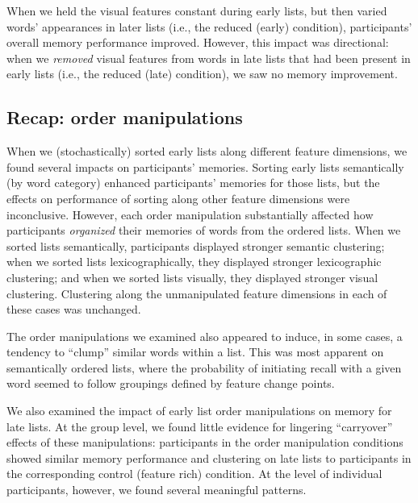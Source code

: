 \documentclass[11pt]{article}
\begin{document}
When we held the visual features constant during early lists, but then varied
words' appearances in later lists (i.e., the reduced (early) condition),
participants' overall memory performance improved. However, this impact was
directional: when we \textit{removed} visual features from words in late lists
that had been present in early lists (i.e., the reduced (late) condition), we
saw no memory improvement.

\subsection*{Recap: order manipulations}

When we (stochastically) sorted early lists along different feature dimensions,
we found several impacts on participants' memories. Sorting early lists
semantically (by word category) enhanced participants' memories for those
lists, but the effects on performance of sorting along other feature dimensions
were inconclusive. However, each order manipulation substantially affected how
participants \textit{organized} their memories of words from the ordered lists.
When we sorted lists semantically, participants displayed stronger semantic
clustering; when we sorted lists lexicographically, they displayed stronger
lexicographic clustering; and when we sorted lists visually, they displayed
stronger visual clustering. Clustering along the unmanipulated feature
dimensions in each of these cases was unchanged.

The order manipulations we examined also appeared to induce, in some cases, a
tendency to ``clump'' similar words within a list. This was most apparent on
semantically ordered lists, where the probability of initiating recall with a
given word seemed to follow groupings defined by feature change points.

We also examined the impact of early list order manipulations on memory for
late lists. At the group level, we found little evidence for lingering
``carryover'' effects of these manipulations: participants in the order
manipulation conditions showed similar memory performance and clustering on
late lists to participants in the corresponding control (feature rich)
condition. At the level of individual participants, however, we found several
meaningful patterns.
\end{document}
